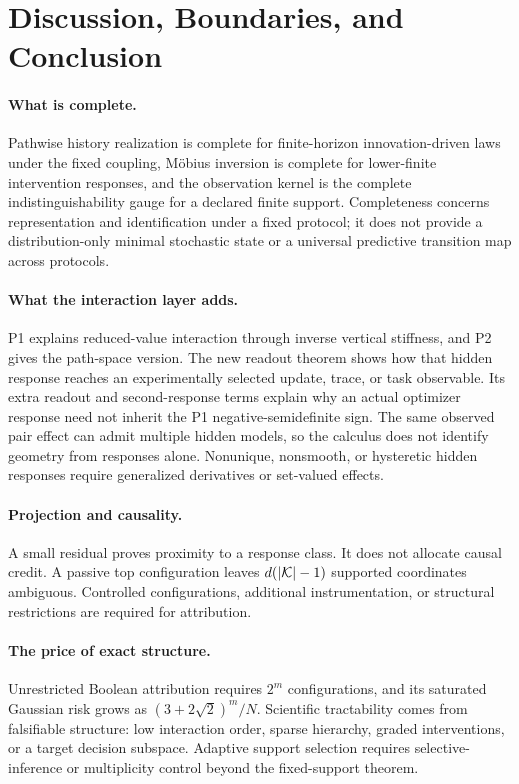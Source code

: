 \section{Discussion, Boundaries, and Conclusion}
\label{sec:discussion}

\paragraph{What is complete.}
Pathwise history realization is complete for finite-horizon innovation-driven laws under the fixed coupling, M\"obius inversion is complete for lower-finite intervention responses, and the observation kernel is the complete indistinguishability gauge for a declared finite support.  Completeness concerns representation and identification under a fixed protocol; it does not provide a distribution-only minimal stochastic state or a universal predictive transition map across protocols.

\paragraph{What the interaction layer adds.}
P1 explains reduced-value interaction through inverse vertical stiffness, and P2 gives the path-space version.  The new readout theorem shows how that hidden response reaches an experimentally selected update, trace, or task observable.  Its extra readout and second-response terms explain why an actual optimizer response need not inherit the P1 negative-semidefinite sign.  The same observed pair effect can admit multiple hidden models, so the calculus does not identify geometry from responses alone.  Nonunique, nonsmooth, or hysteretic hidden responses require generalized derivatives or set-valued effects.

\paragraph{Projection and causality.}
A small residual proves proximity to a response class.  It does not allocate causal credit.  A passive top configuration leaves $d(|\mathcal K|-1)$ supported coordinates ambiguous.  Controlled configurations, additional instrumentation, or structural restrictions are required for attribution.

\paragraph{The price of exact structure.}
Unrestricted Boolean attribution requires $2^m$ configurations, and its saturated Gaussian risk grows as $(3+2\sqrt2)^m/N$.  Scientific tractability comes from falsifiable structure: low interaction order, sparse hierarchy, graded interventions, or a target decision subspace.  Adaptive support selection requires selective-inference or multiplicity control beyond the fixed-support theorem.

